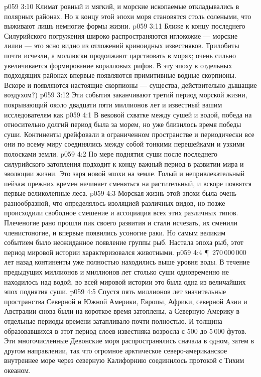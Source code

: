 \vs p059 3:10 Климат ровный и мягкий, и морские ископаемые откладывались в полярных районах. Но к концу этой эпохи моря становятся столь солеными, что выживают лишь немногие формы жизни.
\vs p059 3:11 Ближе к концу последнего Силурийского погружения широко распространяются иглокожие --- морские лилии --- это ясно видно из отложений криноидных известняков. Трилобиты почти исчезли, а моллюски продолжают царствовать в морях; очень сильно увеличивается формирование коралловых рифов. В эту эпоху в отдельных подходящих районах впервые появляются примитивные водные скорпионы. Вскоре и  появляются настоящие скорпионы --- существа, действительно дышащие воздухом?)
\vs p059 3:12 Эти события заканчивают третий период морской жизни, покрывающий около двадцати пяти миллионов лет и известный вашим исследователям как 
\vs p059 4:1 В вековой схватке между сушей и водой, победа на относительно долгий период была за морем, но уже близилось время победы суши. Континенты дрейфовали в ограниченном пространстве и периодически все они по всему миру соединялись между собой тонкими перешейками и узкими полосками земли.
\vs p059 4:2 По мере поднятия суши после последнего силурийского затопления подходит к концу важный период в развитии мира и эволюции жизни. Это заря новой эпохи на земле. Голый и непривлекательный пейзаж прежних времен начинает сменяться на растительный, и вскоре появятся первые великолепные леса.
\vs p059 4:3 Морская жизнь этой эпохи была очень разнообразной, что определялось изоляцией различных видов, но позже происходили свободное смешение и ассоциация всех этих различных типов. Плеченогие рано прошли пик своего развития и стали исчезать, их сменили членистоногие, и впервые появились усоногие раки. Но самым великим событием было неожиданное появление группы рыб. Настала эпоха рыб, этот период мировой истории характеризовался  животными.
\vs p059 4:4 \P\ 270\,000\,000 лет назад континенты уже полностью находились выше уровня воды. В течение предыдущих миллионов и миллионов лет столько суши одновременно не находилось над водой, во всей мировой истории это была одна из величайших эпох поднятия суши.
\vs p059 4:5 Спустя пять миллионов лет значительные пространства Северной и Южной Америки, Европы, Африки, северной Азии и Австралии снова были на короткое время затоплены, а Северную Америку в отдельные периоды времени затапливало почти полностью. И толщина образовавшихся в этот период слоев известняка возросла с 500 до 5\,000 футов. Эти многочисленные Девонские моря распространялись сначала в одном, затем в другом направлении, так что огромное арктическое северо\hyp{}американское внутреннее море через северную Калифорнию соединилось протокой с Тихим океаном.
